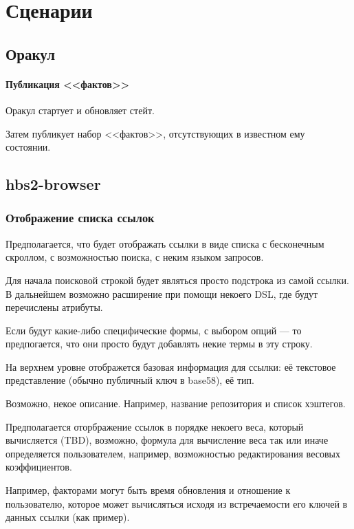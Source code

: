 
\chapter{Сценарии}

\section{Оракул}

\subsubsection{Публикация <<фактов>>}

Оракул стартует и обновляет стейт.

Затем публикует набор <<фактов>>, отсутствующих в известном ему
состоянии.


\section{hbs2-browser}

\subsection{Отображение списка ссылок}

Предполагается, что  будет отображать
ссылки в виде списка с бесконечным скроллом, с возможностью поиска, с
неким языком запросов.

Для начала поисковой строкой будет являться просто подстрока из самой
ссылки. В дальнейшем возможно расширение при помощи некоего DSL, где
будут перечислены атрибуты.

Если будут какие-либо специфические формы, с выбором опций --- то
предпогается, что они просто будут добавлять некие термы в эту строку.

На верхнем уровне отображется базовая информация для ссылки: её
текстовое представление (обычно публичный ключ в base58), её тип.

Возможно, некое описание. Например, название репозитория и список
хэштегов.

Предполагается оторбражение ссылок в порядке некоего веса, который
вычисляется (TBD), возможно, формула для вычисление веса так или
иначе определяется пользователем, например, возможностью
редактирования весовых коэффициентов.

Например, факторами могут быть время обновления и отношение к
пользователю, которое может вычисляться исходя из встречаемости
его ключей в данных ссылки (как пример).


